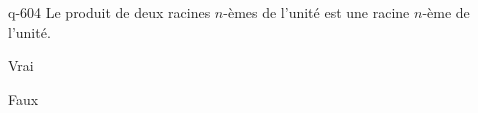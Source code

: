 \begin{truefalse}{q-604}
Le produit de deux racines $n$-èmes de l'unité est une racine $n$-ème de l'unité.
\item* Vrai
\item Faux
\end{truefalse}

